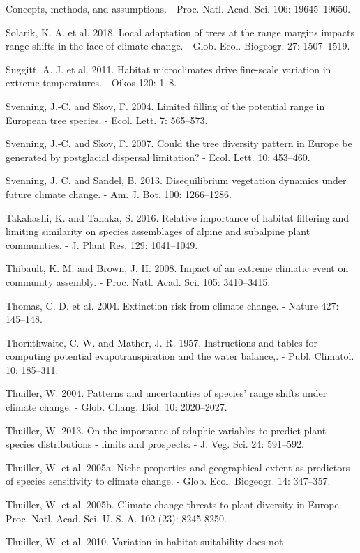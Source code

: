 \documentclass[11pt,twoside]{reedthesis}
\begin{document}
Concepts, methods, and assumptions. - Proc. Natl. Acad. Sci. 106:
19645--19650.\par
Solarik, K. A. et al. 2018. Local adaptation of trees at the range
margins impacts range shifts in the face of climate change. - Glob.
Ecol. Biogeogr. 27: 1507--1519.\par
Suggitt, A. J. et al. 2011. Habitat microclimates drive fine-scale
variation in extreme temperatures. - Oikos 120: 1--8.\par
Svenning, J.-C. and Skov, F. 2004. Limited filling of the potential
range in European tree species. - Ecol. Lett. 7: 565--573.\par
Svenning, J.-C. and Skov, F. 2007. Could the tree diversity pattern in
Europe be generated by postglacial dispersal limitation? - Ecol. Lett.
10: 453--460.\par
Svenning, J. C. and Sandel, B. 2013. Disequilibrium vegetation dynamics
under future climate change. - Am. J. Bot. 100: 1266--1286.\par
Takahashi, K. and Tanaka, S. 2016. Relative importance of habitat
filtering and limiting similarity on species assemblages of alpine and
subalpine plant communities. - J. Plant Res. 129: 1041--1049.\par
Thibault, K. M. and Brown, J. H. 2008. Impact of an extreme climatic
event on community assembly. - Proc. Natl. Acad. Sci. 105:
3410--3415.\par
Thomas, C. D. et al. 2004. Extinction risk from climate change. - Nature
427: 145--148.\par
Thornthwaite, C. W. and Mather, J. R. 1957. Instructions and tables for
computing potential evapotranspiration and the water balance,. - Publ.
Climatol. 10: 185--311.\par
Thuiller, W. 2004. Patterns and uncertainties of species' range shifts
under climate change. - Glob. Chang. Biol. 10: 2020--2027.\par
Thuiller, W. 2013. On the importance of edaphic variables to predict
plant species distributions - limits and prospects. - J. Veg. Sci. 24:
591--592.\par
Thuiller, W. et al. 2005a. Niche properties and geographical extent as
predictors of species sensitivity to climate change. - Glob. Ecol.
Biogeogr. 14: 347--357.\par
Thuiller, W. et al. 2005b. Climate change threats to plant diversity in
Europe. - Proc. Natl. Acad. Sci. U. S. A. 102 (23): 8245-8250.\par
Thuiller, W. et al. 2010. Variation in habitat suitability does not
\end{document}
